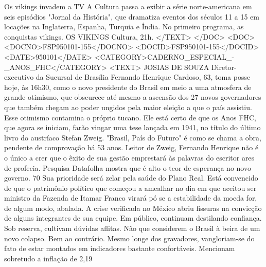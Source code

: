 Os vikings invadem a TV 
A Cultura passa a exibir a série norte-americana em seis episódios "Jornal da História", que dramatiza eventos dos séculos 11 a 15 em locações na Inglaterra, Espanha, Turquia e Índia. No primeiro programa, as conquistas vikings.
OS VIKINGS  Cultura, 21h.
</TEXT>
</DOC>
<DOC>
<DOCNO>FSP950101-155</DOCNO>
<DOCID>FSP950101-155</DOCID>
<DATE>950101</DATE>
<CATEGORY>CADERNO_ESPECIAL_-_ANOS_FHC</CATEGORY>
<TEXT>
JOSIAS DE SOUZA 
Diretor-executivo da Sucursal de Brasília 
Fernando Henrique Cardoso, 63, toma posse hoje, às 16h30, como o novo presidente do Brasil em meio a uma atmosfera de grande otimismo, que obscurece até mesmo a ascensão dos 27 novos governadores que também chegam ao poder ungidos pela maior eleição a que o país assistiu.
Esse otimismo contamina o próprio tucano. Ele está certo de que os  Anos FHC, que agora se iniciam, farão vingar uma tese lançada em 1941, no título do último livro do austríaco Stefan Zweig. "Brasil, País do Futuro" é como se chama a obra, pendente de comprovação há 53 anos. Leitor de Zweig, Fernando Henrique não é o único a crer que o êxito de sua gestão emprestará às palavras do escritor ares de profecia.
Pesquisa Datafolha mostra que é alto o teor de esperança no novo governo. 70%
Sua prioridade será zelar pela saúde do Plano Real. Está convencido de que o patrimônio político que começou a amealhar no dia em que aceitou ser ministro da Fazenda de Itamar Franco virará pó se a estabilidade da moeda for, de algum modo, abalada.
A crise verificada no México abriu fissuras na convicção de alguns integrantes de sua equipe. Em público, continuam destilando confiança. Sob reserva, cultivam dúvidas aflitas. Não que considerem o Brasil à beira de um novo colapso. Bem ao contrário. Mesmo longe dos gravadores, vangloriam-se do fato de estar montados em indicadores bastante confortáveis.
Mencionam sobretudo a inflação de 2,19%
